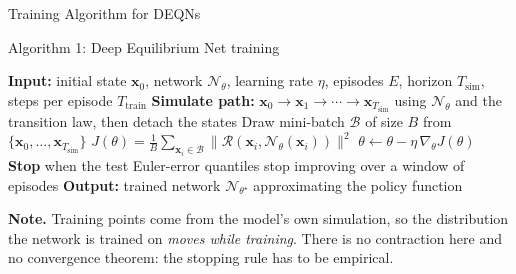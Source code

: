\documentclass[aspectratio=169,11pt]{beamer}
\newcommand{\emphc}[1]{\textcolor{harvardcrimson}{#1}}
\newcommand{\x}{\bm{x}}
\newcommand{\param}{\theta}          %
\newcommand{\state}{\bm{x}}          %
\newcommand{\resid}{\mathcal{R}}     %
\newcommand{\net}{\mathcal{N}_{\param}} %
\begin{document}
\begin{frame}{Training Algorithm for DEQNs}
\begin{block}{Algorithm 1: Deep Equilibrium Net training}
\begin{algorithmic}
\footnotesize
\STATE \textbf{Input:} initial state $\state_0$, network $\net$, learning rate $\eta$, episodes $E$, horizon $T_{\mathrm{sim}}$, steps per episode $T_{\mathrm{train}}$
    \STATE \textbf{Simulate path:} $\state_0 \to \state_1 \to \cdots \to \state_{T_{\mathrm{sim}}}$ using $\net$ and the transition law, then \emphc{detach} the states
        \STATE Draw mini-batch $\mathcal{B}$ of size $B$ from $\{\state_0, \ldots, \state_{T_{\mathrm{sim}}}\}$
        \STATE $J(\param) = \frac{1}{B}\sum_{\state_i \in \mathcal{B}} \|\resid(\state_i, \net(\state_i))\|^2$
        \STATE $\param \leftarrow \param - \eta \, \nabla_\param J(\param)$
    \ENDFOR
    \STATE \textbf{Stop} when the test Euler-error quantiles stop improving over a window of episodes
\ENDFOR
\STATE \textbf{Output:} trained network $\mathcal{N}_{\param^\star}$ approximating the policy function
\end{algorithmic}
\end{block}

\vspace{0.2em}
{\footnotesize \textbf{Note.} Training points come from the \emphc{model's own simulation}, so the distribution the network is trained on \emph{moves while training}. There is no contraction here and no convergence theorem: the stopping rule has to be empirical.}
\end{frame}
\end{document}
